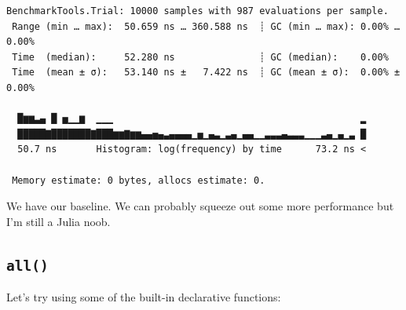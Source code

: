 \documentclass[
  8pt,
  a4paper,
]{book}
\newenvironment{Shaded}{\begin{snugshade}}{\end{snugshade}}
\newcommand{\ConstantTok}[1]{\textcolor[rgb]{0.56,0.35,0.01}{#1}}
\newcommand{\ControlFlowTok}[1]{\textcolor[rgb]{0.00,0.23,0.31}{\textbf{#1}}}
\newcommand{\FloatTok}[1]{\textcolor[rgb]{0.68,0.00,0.00}{#1}}
\newcommand{\FunctionTok}[1]{\textcolor[rgb]{0.28,0.35,0.67}{#1}}
\newcommand{\KeywordTok}[1]{\textcolor[rgb]{0.00,0.23,0.31}{\textbf{#1}}}
\newcommand{\NormalTok}[1]{\textcolor[rgb]{0.00,0.23,0.31}{#1}}
\newcommand{\OperatorTok}[1]{\textcolor[rgb]{0.37,0.37,0.37}{#1}}
\newcommand{\PreprocessorTok}[1]{\textcolor[rgb]{0.68,0.00,0.00}{#1}}
\begin{document}
\begin{Shaded}
\end{Shaded}

\begin{verbatim}
BenchmarkTools.Trial: 10000 samples with 987 evaluations per sample.
 Range (min … max):  50.659 ns … 360.588 ns  ┊ GC (min … max): 0.00% … 0.00%
 Time  (median):     52.280 ns               ┊ GC (median):    0.00%
 Time  (mean ± σ):   53.140 ns ±   7.422 ns  ┊ GC (mean ± σ):  0.00% ± 0.00%

  █▆▆▃▄ █ ▅▁▁▆  ▁▁▁                                            ▂
  █████▇███████▇███▆▆▇▆▆▄▄▅▄▃▄▄▄▄▁▅▁▄▃▁▃▄▁▄▄▁▁▃▃▃▄▃▃▃▁▁▁▃▄▁▄▁▃ █
  50.7 ns       Histogram: log(frequency) by time      73.2 ns <

 Memory estimate: 0 bytes, allocs estimate: 0.
\end{verbatim}

We have our baseline. We can probably squeeze out some more performance
but I'm still a Julia noob.

\subsection{\texorpdfstring{\texttt{all()}}{all()}}\label{all}

Let's try using some of the built-in declarative functions:

\begin{Shaded}
\end{Shaded}
\end{document}
